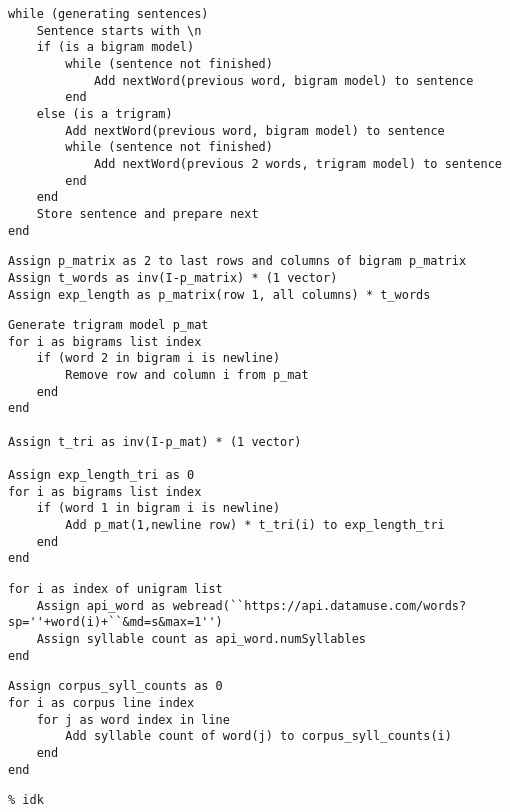 \documentclass{article}
\begin{document}
 \lstset{language=Matlab, tabsize=4}

\begin{lstlisting}
while (generating sentences)
	Sentence starts with \n
	if (is a bigram model)
		while (sentence not finished)
			Add nextWord(previous word, bigram model) to sentence
		end
	else (is a trigram)
		Add nextWord(previous word, bigram model) to sentence
		while (sentence not finished)
			Add nextWord(previous 2 words, trigram model) to sentence
		end
	end
	Store sentence and prepare next
end
\end{lstlisting}

\begin{lstlisting}
Assign p_matrix as 2 to last rows and columns of bigram p_matrix
Assign t_words as inv(I-p_matrix) * (1 vector)
Assign exp_length as p_matrix(row 1, all columns) * t_words
\end{lstlisting}

\begin{lstlisting}
Generate trigram model p_mat
for i as bigrams list index
	if (word 2 in bigram i is newline)
		Remove row and column i from p_mat
	end
end

Assign t_tri as inv(I-p_mat) * (1 vector)

Assign exp_length_tri as 0
for i as bigrams list index
	if (word 1 in bigram i is newline)
		Add p_mat(1,newline row) * t_tri(i) to exp_length_tri
	end
end
\end{lstlisting}

\begin{lstlisting}
for i as index of unigram list
	Assign api_word as webread(``https://api.datamuse.com/words?sp=''+word(i)+``&md=s&max=1'')
	Assign syllable count as api_word.numSyllables
end
\end{lstlisting}

\begin{lstlisting}
Assign corpus_syll_counts as 0
for i as corpus line index
	for j as word index in line
		Add syllable count of word(j) to corpus_syll_counts(i)
	end
end
\end{lstlisting}

\begin{lstlisting}
% idk
\end{lstlisting}

 
\end{document}
